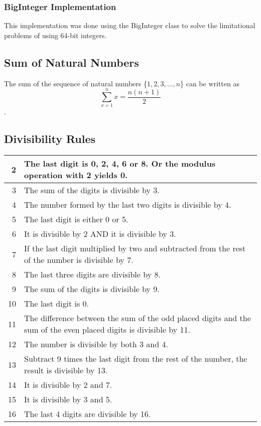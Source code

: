 \documentclass[letterpaper]{article}
\begin{document}
      \subsubsection{BigInteger Implementation}
        This implementation was done using the BigInteger class to solve the limitational problems of using 64-bit integers.
        

    \subsection{Sum of Natural Numbers}
      The sum of the sequence of natural numbers \{$1, 2, 3, ... , n$\} can be written as \[\sum_{x=1}^{n} x = \frac{n(n+1)}{2}\].

    \subsection{Divisibility Rules}
    \begin{tabular}{ | r | l |}
      \hline
      2 & The last digit is 0, 2, 4, 6 or 8. Or the modulus operation with 2 yields 0. \\
      \hline
      3 & The sum of the digits is divisible by 3. \\
      \hline
      4 & The number formed by the last two digits is divisible by 4. \\
      \hline
      5 & The last digit is either 0 or 5. \\
      \hline
      6 & It is divisible by 2 AND it is divisible by 3. \\
      \hline
      7 & If the last digit multiplied by two and subtracted from the rest of the number is divisible by 7. \\
      \hline
      8 & The last three digits are divisible by 8. \\
      \hline
      9 & The sum of the digits is divisible by 9. \\
      \hline
      10 & The last digit is 0. \\
      \hline
      11 & The difference between the sum of the odd placed digits and the sum of the even placed digits is divisible by 11. \\
      \hline
      12 & The number is divisible by both 3 and 4. \\
      \hline
      13 & Subtract 9 times the last digit from the rest of the number, the result is divisible by 13. \\
      \hline
      14 & It is divisible by 2 and 7. \\
      \hline
      15 & It is divisible by 3 and 5. \\
      \hline
      16 & The last 4 digits are divisible by 16. \\
      \hline
    \end{tabular}
\end{document}
